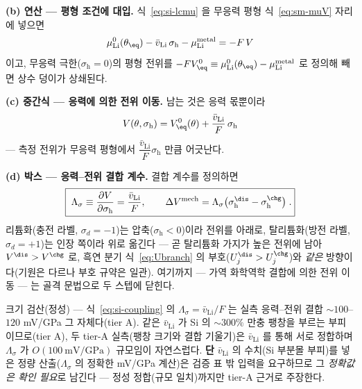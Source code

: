 \textbf{(b) 연산 --- 평형 조건에 대입.} 식~\eqref{eq:si-lcmu} 을 무응력 평형
식~\eqref{eq:sm-muV} 자리에 넣으면
\begin{equation}
\mu_\mathrm{Li}^{0}(\theta_\eq)-\bar v_\mathrm{Li}\,\sigma_\mathrm{h}-\mu_\mathrm{Li}^\mathrm{metal}=-F\,V
\label{eq:si-lcbal}
\end{equation}
이고, 무응력 극한($\sigma_\mathrm{h}{=}0$)의 평형 전위를
$-FV_\eq^{0}\equiv\mu_\mathrm{Li}^{0}(\theta_\eq)-\mu_\mathrm{Li}^\mathrm{metal}$ 로 정의해 빼면 상수
덩이가 상쇄된다.

\textbf{(c) 중간식 --- 응력에 의한 전위 이동.} 남는 것은 응력 몫뿐이라
\begin{equation}
V(\theta,\sigma_\mathrm{h})=V_\eq^{0}(\theta)+\frac{\bar v_\mathrm{Li}}{F}\,\sigma_\mathrm{h}
\label{eq:si-vshift}
\end{equation}
--- 측정 전위가 무응력 평형에서 $\dfrac{\bar v_\mathrm{Li}}{F}\sigma_\mathrm{h}$ 만큼 어긋난다.

\textbf{(d) 박스 --- 응력--전위 결합 계수.} 결합 계수를 정의하면
\begin{equation}
\boxed{\;\Lambda_\sigma\equiv\frac{\partial V}{\partial\sigma_\mathrm{h}}=\frac{\bar v_\mathrm{Li}}{F},
\qquad
\Delta V^\mathrm{mech}=\Lambda_\sigma\bigl(\sigma_\mathrm{h}^{\dis}-\sigma_\mathrm{h}^{\chg}\bigr)\;.}
\label{eq:si-coupling}
\end{equation}
리튬화(충전 라벨, $\sigma_d{=}-1$)는 압축($\sigma_\mathrm{h}<0$)이라 전위를 아래로, 탈리튬화(방전 라벨,
$\sigma_d{=}+1$)는 인장 쪽이라 위로 옮긴다 --- 곧 탈리튬화 가지가 높은 전위에 남아
$V^{\dis}>V^{\chg}$ 로, 흑연 분기 식~\eqref{eq:Ubranch} 의 부호($U_j^{\dis}>U_j^{\chg}$)와 \emph{같은}
방향이다(기원은 다르나 부호 규약은 일관). 여기까지 --- 가역 화학역학 결합에 의한 전위 이동 --- 는 골격
문법으로 두 스텝에 닫힌다.
\begin{verifybox}
크기 검산(정성) --- 식~\eqref{eq:si-coupling} 의 $\Lambda_\sigma=\bar v_\mathrm{Li}/F$ 는 실측
응력--전위 결합 $\sim100$--$120$ mV/GPa 그 자체다(tier A\cite{sethuraman_stresspot2010}). 같은
$\bar v_\mathrm{Li}$ 가 Si 의 $\sim300\%$ 만충 팽창을 부르는 부피이므로(tier A\cite{beaulieu2001}), 두
tier-A 실측(팽창 크기와 결합 기울기)은 $\bar v_\mathrm{Li}$ 를 통해 서로 정합하며 $\Lambda_\sigma$ 가
$O(100\ \mathrm{mV/GPa})$ 규모임이 자연스럽다. \textbf{단} $\bar v_\mathrm{Li}$ 의 수치(Si 부분몰 부피)를
넣은 정량 산출($\Lambda_\sigma$ 의 정확한 mV/GPa 계산)은 검증 표 밖 입력을 요구하므로 그 \emph{정확값은
확인 필요}로 남긴다 --- 정성 정합(규모 일치)까지만 tier-A 근거로 주장한다.
\end{verifybox}

